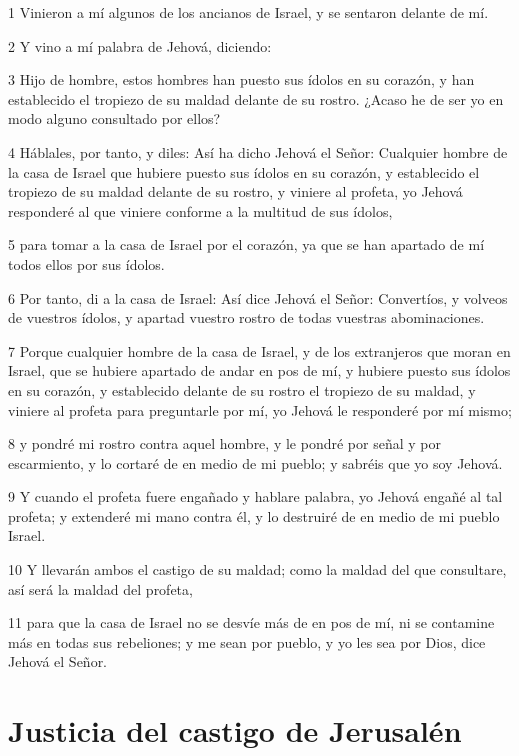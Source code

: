 \par 1 Vinieron a mí algunos de los ancianos de Israel, y se sentaron delante de mí.
\par 2 Y vino a mí palabra de Jehová, diciendo:
\par 3 Hijo de hombre, estos hombres han puesto sus ídolos en su corazón, y han establecido el tropiezo de su maldad delante de su rostro. ¿Acaso he de ser yo en modo alguno consultado por ellos?
\par 4 Háblales, por tanto, y diles: Así ha dicho Jehová el Señor: Cualquier hombre de la casa de Israel que hubiere puesto sus ídolos en su corazón, y establecido el tropiezo de su maldad delante de su rostro, y viniere al profeta, yo Jehová responderé al que viniere conforme a la multitud de sus ídolos,
\par 5 para tomar a la casa de Israel por el corazón, ya que se han apartado de mí todos ellos por sus ídolos.
\par 6 Por tanto, di a la casa de Israel: Así dice Jehová el Señor: Convertíos, y volveos de vuestros ídolos, y apartad vuestro rostro de todas vuestras abominaciones.
\par 7 Porque cualquier hombre de la casa de Israel, y de los extranjeros que moran en Israel, que se hubiere apartado de andar en pos de mí, y hubiere puesto sus ídolos en su corazón, y establecido delante de su rostro el tropiezo de su maldad, y viniere al profeta para preguntarle por mí, yo Jehová le responderé por mí mismo;
\par 8 y pondré mi rostro contra aquel hombre, y le pondré por señal y por escarmiento, y lo cortaré de en medio de mi pueblo; y sabréis que yo soy Jehová.
\par 9 Y cuando el profeta fuere engañado y hablare palabra, yo Jehová engañé al tal profeta; y extenderé mi mano contra él, y lo destruiré de en medio de mi pueblo Israel.
\par 10 Y llevarán ambos el castigo de su maldad; como la maldad del que consultare, así será la maldad del profeta,
\par 11 para que la casa de Israel no se desvíe más de en pos de mí, ni se contamine más en todas sus rebeliones; y me sean por pueblo, y yo les sea por Dios, dice Jehová el Señor.

\section*{Justicia del castigo de Jerusalén}


